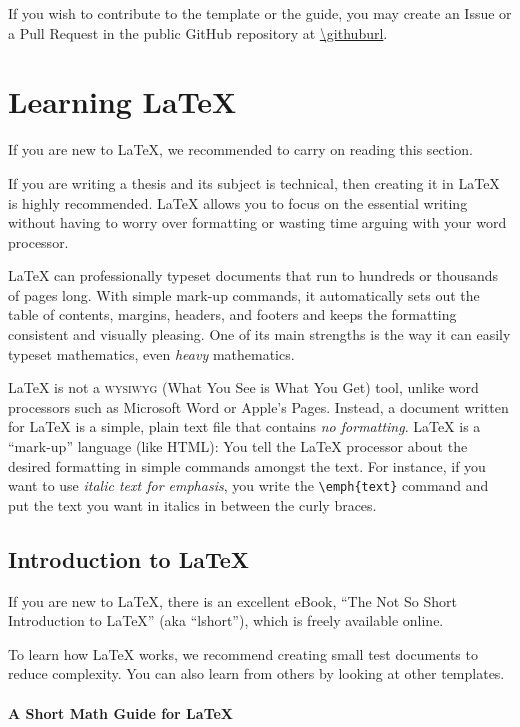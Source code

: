 If you wish to contribute to the template or the guide, you may create an Issue or a Pull Request in the public GitHub repository at \url{\githuburl}.

\section{Learning LaTeX}

If you are new to LaTeX, we recommended to carry on reading this section.

If you are writing a thesis and its subject is technical, then creating it in LaTeX is highly recommended. LaTeX allows you to focus on the essential writing without having to worry over formatting or wasting time arguing with your word processor.

LaTeX can professionally typeset documents that run to hundreds or thousands of pages long. With simple mark-up commands, it automatically sets out the table of contents, margins, headers, and footers and keeps the formatting consistent and visually pleasing. One of its main strengths is the way it can easily typeset mathematics, even \emph{heavy} mathematics.

LaTeX is not a \textsc{wysiwyg} (What You See is What You Get) tool, unlike word processors such as Microsoft Word or Apple's Pages. Instead, a document written for LaTeX is a simple, plain text file that contains \emph{no formatting}.
LaTeX is a \enquote{mark-up} language (like HTML): You tell the LaTeX processor about the desired formatting in simple commands amongst the text. For instance, if you want to use \emph{italic text for emphasis}, you write the \verb|\emph{text}| command and put the text you want in italics in between the curly braces.

\subsection{Introduction to LaTeX}

If you are new to LaTeX, there is an excellent eBook, \enquote{The Not So Short Introduction to LaTeX} (aka ``lshort''), which is freely available online.

To learn how LaTeX works, we recommend creating small test documents to reduce complexity. You can also learn from others by looking at other templates.

\paragraph{A Short Math Guide for LaTeX}

